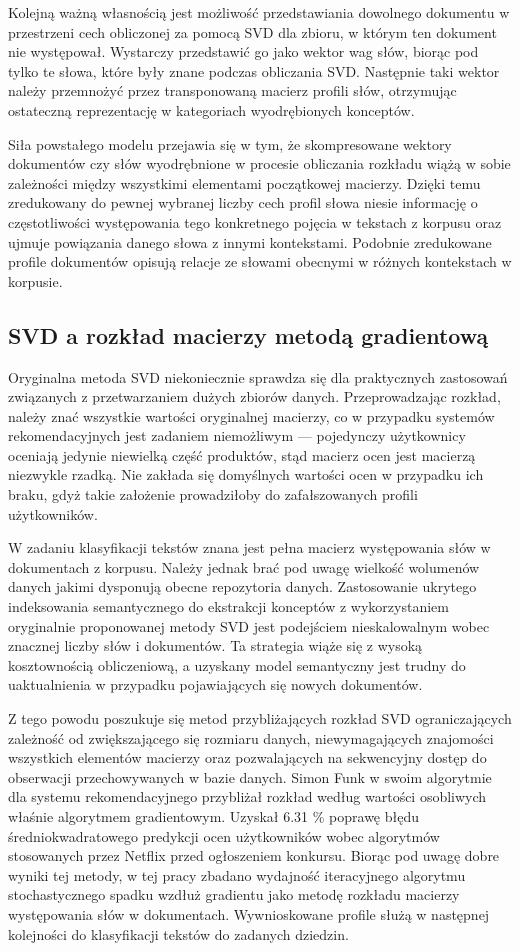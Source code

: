 \documentclass{pracamgr}
\begin{document}
Kolejną ważną własnością jest możliwość przedstawiania dowolnego dokumentu w przestrzeni cech obliczonej za pomocą SVD dla zbioru, w którym ten dokument nie występował. Wystarczy przedstawić go jako wektor wag słów, biorąc pod tylko te słowa, które były znane podczas obliczania SVD. Następnie taki wektor należy przemnożyć przez transponowaną macierz profili słów, otrzymując ostateczną reprezentację w kategoriach wyodrębionych konceptów.

Siła powstałego modelu przejawia się w tym, że skompresowane wektory dokumentów czy słów wyodrębnione w procesie obliczania rozkładu wiążą w sobie zależności między wszystkimi elementami początkowej macierzy. Dzięki temu zredukowany do pewnej wybranej liczby cech profil słowa niesie informację o częstotliwości występowania tego konkretnego pojęcia w tekstach z korpusu oraz ujmuje powiązania danego słowa z innymi kontekstami. Podobnie zredukowane profile dokumentów opisują relacje ze słowami obecnymi w różnych kontekstach w korpusie.

\subsection{SVD a rozkład macierzy metodą gradientową}
Oryginalna metoda SVD niekoniecznie sprawdza się dla praktycznych zastosowań związanych z przetwarzaniem dużych zbiorów danych. Przeprowadzając rozkład, należy znać wszystkie wartości oryginalnej macierzy, co w przypadku systemów rekomendacyjnych jest zadaniem niemożliwym --- pojedynczy użytkownicy oceniają jedynie niewielką część produktów, stąd macierz ocen jest macierzą niezwykle rzadką. Nie zakłada się domyślnych wartości ocen w przypadku ich braku, gdyż takie założenie prowadziłoby do zafałszowanych profili użytkowników. 

W zadaniu klasyfikacji tekstów znana jest pełna macierz występowania słów w dokumentach z korpusu. Należy jednak brać pod uwagę wielkość wolumenów danych jakimi dysponują obecne repozytoria danych. Zastosowanie ukrytego indeksowania semantycznego do ekstrakcji konceptów z wykorzystaniem oryginalnie proponowanej metody SVD jest podejściem nieskalowalnym wobec znacznej liczby słów i dokumentów. Ta strategia wiąże się z wysoką kosztownością obliczeniową, a uzyskany model semantyczny jest trudny do uaktualnienia w przypadku pojawiających się nowych dokumentów.

Z tego powodu poszukuje się metod przybliżających rozkład SVD ograniczających zależność od zwiększającego się rozmiaru danych, niewymagających znajomości wszystkich elementów macierzy oraz pozwalających na sekwencyjny dostęp do obserwacji przechowywanych w bazie danych. Simon Funk w swoim algorytmie dla systemu rekomendacyjnego przybliżał rozkład według wartości osobliwych właśnie algorytmem gradientowym. Uzyskał 6.31 \% poprawę błędu średniokwadratowego predykcji ocen użytkowników wobec algorytmów stosowanych przez Netflix przed ogłoszeniem konkursu. Biorąc pod uwagę dobre wyniki tej metody, w tej pracy zbadano wydajność iteracyjnego algorytmu stochastycznego spadku wzdłuż gradientu jako metodę rozkładu macierzy występowania słów w dokumentach. Wywnioskowane profile służą w następnej kolejności do klasyfikacji tekstów do zadanych dziedzin.
\end{document}

